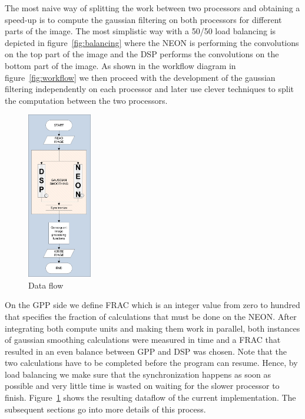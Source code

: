 The most naive way of splitting the work between two processors and obtaining a speed-up is to compute the gaussian filtering on both processors for different parts of the image. The most simplistic way with a 50/50 load balancing is depicted in figure~\ref{fig:balancing} where the NEON is performing the convolutions on the top part of the image and the DSP performs the convolutions on the bottom part of the image. As shown in the workflow diagram in figure~\ref{fig:workflow} we then proceed with the development of the gaussian filtering independently on each processor and later use clever techniques to split the computation between the two processors.


\begin{figure}
\centering
\includegraphics[width=0.25\textwidth]{drawings/model}
\caption{Data flow}
\label{fig:dataflow}
\end{figure}


On the GPP side we define FRAC which is an integer value from zero to hundred that specifies the fraction of calculations that must be done on the NEON. After integrating both compute units and making them work in parallel, both instances of gaussian smoothing calculations were measured in time and a FRAC that resulted in an even balance between GPP and DSP was chosen. Note that the two calculations have to be completed before the program can resume.
Hence, by load balancing we make sure that the synchronization happens as soon as possible and very little time is wasted on waiting for the slower processor to finish. Figure~\ref{fig:dataflow} shows the resulting dataflow of the current implementation. The subsequent sections go into more details of this process.





